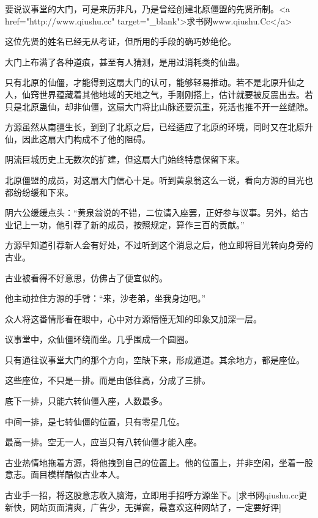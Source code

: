 
\begin{this_body}

要说议事堂的大门，可是来历非凡，乃是曾经创建北原僵盟的先贤所制。<a href="http://www.qiushu.cc" target="\_blank">求书网www.qiushu.Cc</a>

这位先贤的姓名已经无从考证，但所用的手段的确巧妙绝伦。

大门上布满了各种道痕，甚至有人猜测，是用过消耗类的仙蛊。

只有北原的仙僵，才能得到这扇大门的认可，能够轻易推动。若不是北原升仙之人，仙窍世界蕴藏着其他地域的天地之气，手刚刚搭上，估计就要被反震出去。若只是北原蛊仙，却非仙僵，这扇大门将比山脉还要沉重，死活也推不开一丝缝隙。

方源虽然从南疆生长，到到了北原之后，已经适应了北原的环境，同时又在北原升仙，因此这扇大门构成不了他的阻碍。

阴流巨城历史上无数次的扩建，但这扇大门始终特意保留下来。

北原僵盟的成员，对这扇大门信心十足。听到黄泉翁这么一说，看向方源的目光也都纷纷缓和下来。

阴六公缓缓点头：“黄泉翁说的不错，二位请入座罢，正好参与议事。另外，给古业记上一功，他引荐了新的成员，按照规定，算作三百的贡献。”

方源早知道引荐新人会有好处，不过听到这个消息之后，他立即将目光转向身旁的古业。

古业被看得不好意思，仿佛占了便宜似的。

他主动拉住方源的手臂：“来，沙老弟，坐我身边吧。”

众人将这番情形看在眼中，心中对方源懵懂无知的印象又加深一层。

议事堂中，众仙僵环绕而坐。几乎围成一个圆圈。

只有通往议事堂大门的那个方向，空缺下来，形成通道。其余地方，都是座位。

这些座位，不只是一排。而是由低往高，分成了三排。

底下一排，只能六转仙僵入座，人数最多。

中间一排，是七转仙僵的位置，只有零星几位。

最高一排。空无一人，应当只有八转仙僵才能入座。

古业热情地拖着方源，将他拽到自己的位置上。他的位置上，并非空闲，坐着一股意志。面目模样酷似古业本人。

古业手一招，将这股意志收入脑海，立即用手招呼方源坐下。[求书网qiushu.cc更新快，网站页面清爽，广告少，无弹窗，最喜欢这种网站了，一定要好评]


\end{this_body}
